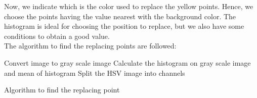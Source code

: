 Now, we indicate which is the color used to replace the yellow points. Hence, we choose the points having the value nearest with the background color. The histogram is ideal for choosing the position to replace, but we also have some conditions to obtain a good value.\\
The algorithm to find the replacing points are 
followed:\\
\IncMargin{1em}
\begin{algorithm}[H]
\Indm 
{}
\Indp
Convert image to gray scale image\;
Calculate the histogram on gray scale image and mean of histogram\;
Split the HSV image into channels\;

\caption{Algorithm to find the replacing point}
\end{algorithm}\DecMargin{1em}
